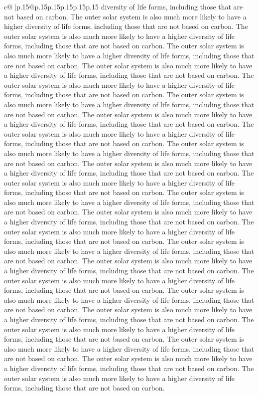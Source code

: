 \documentclass{article}
\begin{document}
{\begin{supertabular}{c@{$\;$}|p{.15\linewidth}@{}p{.15\linewidth}p{.15\linewidth}p{.15\linewidth}p{.15\linewidth}p{.15\linewidth}}
{{{diversity of life forms, including those that are not based on carbon. The outer solar system is also much more likely to have a higher diversity of life forms, including those that are not based on carbon. The outer solar system is also much more likely to have a higher diversity of life forms, including those that are not based on carbon. The outer solar system is also much more likely to have a higher diversity of life forms, including those that are not based on carbon. The outer solar system is also much more likely to have a higher diversity of life forms, including those that are not based on carbon. The outer solar system is also much more likely to have a higher diversity of life forms, including those that are not based on carbon. The outer solar system is also much more likely to have a higher diversity of life forms, including those that are not based on carbon. The outer solar system is also much more likely to have a higher diversity of life forms, including those that are not based on carbon. The outer solar system is also much more likely to have a higher diversity of life forms, including those that are not based on carbon. The outer solar system is also much more likely to have a higher diversity of life forms, including those that are not based on carbon. The outer solar system is also much more likely to have a higher diversity of life forms, including those that are not based on carbon. The outer solar system is also much more likely to have a higher diversity of life forms, including those that are not based on carbon. The outer solar system is also much more likely to have a higher diversity of life forms, including those that are not based on carbon. The outer solar system is also much more likely to have a higher diversity of life forms, including those that are not based on carbon. The outer solar system is also much more likely to have a higher diversity of life forms, including those that are not based on carbon. The outer solar system is also much more likely to have a higher diversity of life forms, including those that are not based on carbon. The outer solar system is also much more likely to have a higher diversity of life forms, including those that are not based on carbon. The outer solar system is also much more likely to have a higher diversity of life forms, including those that are not based on carbon. The outer solar system is also much more likely to have a higher diversity of life forms, including those that are not based on carbon. The outer solar system is also much more likely to have a higher diversity of life forms, including those that are not based on carbon. The outer solar system is also much more likely to have a higher diversity of life forms, including those that are not based on carbon. The outer solar system is also much more likely to have a higher diversity of life forms, including those that are not based on carbon. The outer solar system is also much more likely to have a higher diversity of life forms, including those that are not based on carbon. The outer solar system is also much more likely to have a higher diversity of life forms, including those that are not based on carbon. }}}
\end{supertabular}}
\end{document}
